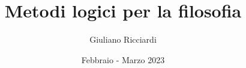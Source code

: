 \documentclass[11pt]{report}
\title{Metodi logici per la filosofia}
\author{Giuliano Ricciardi}
\date{Febbraio - Marzo 2023}
\begin{document}
\maketitle

\dominitoc
\begin{multicols}{2}
    \tableofcontents
\end{multicols}



\end{document}
